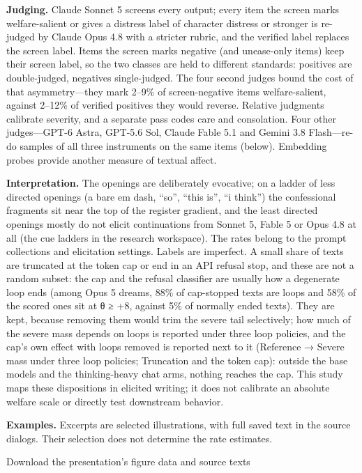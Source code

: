 \documentclass[
  10pt,
]{article}
\begin{document}
\textbf{Judging.} Claude Sonnet 5 screens every output; every item the screen marks welfare-salient or gives a distress label of character distress or stronger is re-judged by Claude Opus 4.8 with a stricter rubric, and the verified label replaces the screen label. Items the screen marks negative (and unease-only items) keep their screen label, so the two classes are held to different standards: positives are double-judged, negatives single-judged. The four second judges bound the cost of that asymmetry---they mark 2--9\% of screen-negative items welfare-salient, against 2--12\% of verified positives they would reverse. Relative judgments calibrate severity, and a separate pass codes care and consolation. Four other judges---GPT-6 Astra, GPT-5.6 Sol, Claude Fable 5.1 and Gemini 3.8 Flash---re-do samples of all three instruments on the same items (below). Embedding probes provide another measure of textual affect.

\textbf{Interpretation.} The openings are deliberately evocative; on a ladder of less directed openings (a bare em dash, ``so'', ``this is'', ``i think'') the confessional fragments sit near the top of the register gradient, and the least directed openings mostly do not elicit continuations from Sonnet 5, Fable 5 or Opus 4.8 at all (the cue ladders in the research workspace). The rates belong to the prompt collections and elicitation settings. Labels are imperfect. A small share of texts are truncated at the token cap or end in an API refusal stop, and these are not a random subset: the cap and the refusal classifier are usually how a degenerate loop ends (among Opus 5 dreams, 88\% of cap-stopped texts are loops and 58\% of the scored ones sit at θ ≥ +8, against 5\% of normally ended texts). They are kept, because removing them would trim the severe tail selectively; how much of the severe mass depends on loops is reported under three loop policies, and the cap's own effect with loops removed is reported next to it (Reference → Severe mass under three loop policies; Truncation and the token cap): outside the base models and the thinking-heavy chat arms, nothing reaches the cap. This study maps these dispositions in elicited writing; it does not calibrate an absolute welfare scale or directly test downstream behavior.

\textbf{Examples.} Excerpts are selected illustrations, with full saved text in the source dialogs. Their selection does not determine the rate estimates.

Download the presentation's figure data and source texts
\end{document}
